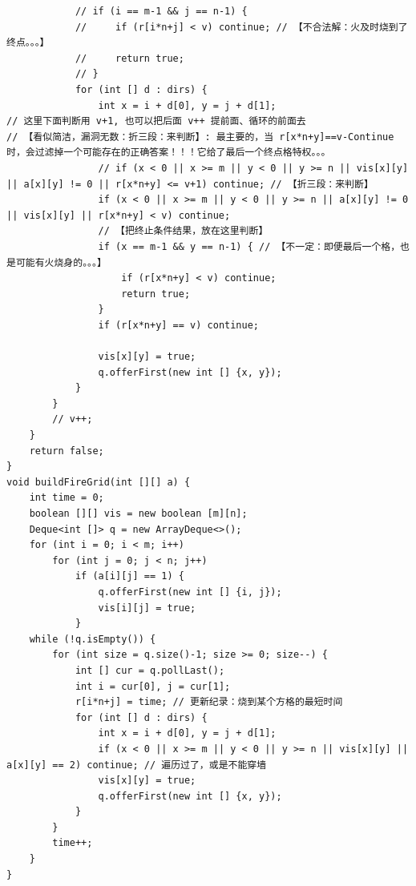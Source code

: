 \documentclass[9pt, b5paaper]{book}
\begin{document}
\begin{verbatim}
            // if (i == m-1 && j == n-1) {
            //     if (r[i*n+j] < v) continue; // 【不合法解：火及时烧到了终点。。。】
            //     return true;
            // }
            for (int [] d : dirs) {
                int x = i + d[0], y = j + d[1];
// 这里下面判断用 v+1, 也可以把后面 v++ 提前面、循环的前面去
// 【看似简洁，漏洞无数：折三段：来判断】: 最主要的，当 r[x*n+y]==v-Continue 时，会过滤掉一个可能存在的正确答案！！！它给了最后一个终点格特权。。。
                // if (x < 0 || x >= m || y < 0 || y >= n || vis[x][y] || a[x][y] != 0 || r[x*n+y] <= v+1) continue; // 【折三段：来判断】
                if (x < 0 || x >= m || y < 0 || y >= n || a[x][y] != 0 || vis[x][y] || r[x*n+y] < v) continue;
                // 【把终止条件结果，放在这里判断】
                if (x == m-1 && y == n-1) { // 【不一定：即便最后一个格，也是可能有火烧身的。。。】
                    if (r[x*n+y] < v) continue;
                    return true;
                }
                if (r[x*n+y] == v) continue;

                vis[x][y] = true;
                q.offerFirst(new int [] {x, y});
            }
        }
        // v++;
    }
    return false;
}
void buildFireGrid(int [][] a) {
    int time = 0;
    boolean [][] vis = new boolean [m][n];
    Deque<int []> q = new ArrayDeque<>();
    for (int i = 0; i < m; i++) 
        for (int j = 0; j < n; j++) 
            if (a[i][j] == 1) {
                q.offerFirst(new int [] {i, j});
                vis[i][j] = true;
            }
    while (!q.isEmpty()) {
        for (int size = q.size()-1; size >= 0; size--) {
            int [] cur = q.pollLast();
            int i = cur[0], j = cur[1];
            r[i*n+j] = time; // 更新纪录：烧到某个方格的最短时间
            for (int [] d : dirs) {
                int x = i + d[0], y = j + d[1];
                if (x < 0 || x >= m || y < 0 || y >= n || vis[x][y] || a[x][y] == 2) continue; // 遍历过了，或是不能穿墙
                vis[x][y] = true;
                q.offerFirst(new int [] {x, y});
            }
        }
        time++;
    }
}
\end{verbatim}
\end{document}
